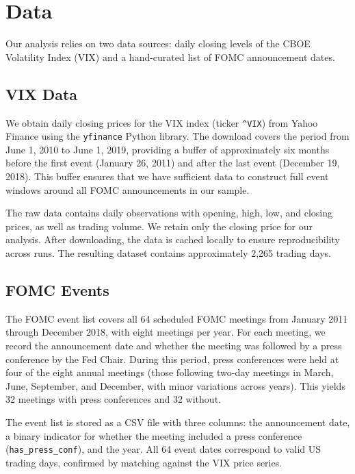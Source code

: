 \section{Data}
\label{sec:data}

Our analysis relies on two data sources: daily closing levels of the CBOE Volatility Index (VIX) and a hand-curated list of FOMC announcement dates.

\subsection{VIX Data}

We obtain daily closing prices for the VIX index (ticker \texttt{\^{}VIX}) from Yahoo Finance using the \texttt{yfinance} Python library. The download covers the period from June 1, 2010 to June 1, 2019, providing a buffer of approximately six months before the first event (January 26, 2011) and after the last event (December 19, 2018). This buffer ensures that we have sufficient data to construct full event windows around all FOMC announcements in our sample.

The raw data contains daily observations with opening, high, low, and closing prices, as well as trading volume. We retain only the closing price for our analysis. After downloading, the data is cached locally to ensure reproducibility across runs. The resulting dataset contains approximately 2,265 trading days.

\subsection{FOMC Events}

The FOMC event list covers all 64 scheduled FOMC meetings from January 2011 through December 2018, with eight meetings per year. For each meeting, we record the announcement date and whether the meeting was followed by a press conference by the Fed Chair. During this period, press conferences were held at four of the eight annual meetings (those following two-day meetings in March, June, September, and December, with minor variations across years). This yields 32 meetings with press conferences and 32 without.

The event list is stored as a CSV file with three columns: the announcement date, a binary indicator for whether the meeting included a press conference (\texttt{has\_press\_conf}), and the year. All 64 event dates correspond to valid US trading days, confirmed by matching against the VIX price series.

